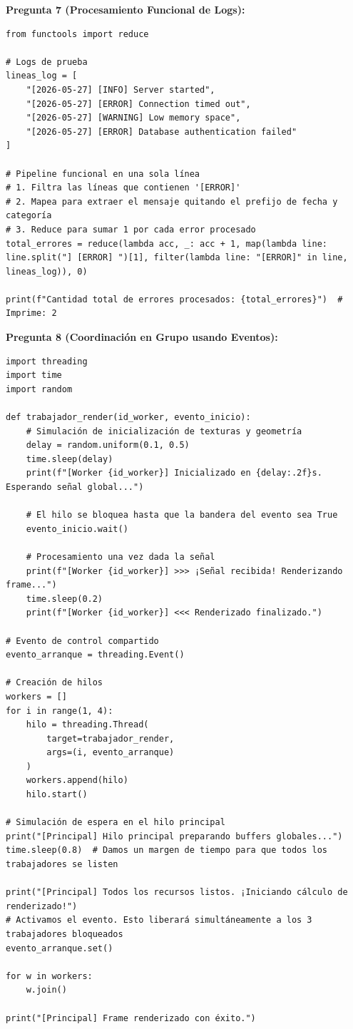 \documentclass[12pt,letterpaper]{article}
\begin{document}
\textbf{Pregunta 7 (Procesamiento Funcional de Logs):}
\begin{verbatim}
from functools import reduce

# Logs de prueba
lineas_log = [
    "[2026-05-27] [INFO] Server started",
    "[2026-05-27] [ERROR] Connection timed out",
    "[2026-05-27] [WARNING] Low memory space",
    "[2026-05-27] [ERROR] Database authentication failed"
]

# Pipeline funcional en una sola línea
# 1. Filtra las líneas que contienen '[ERROR]'
# 2. Mapea para extraer el mensaje quitando el prefijo de fecha y categoría
# 3. Reduce para sumar 1 por cada error procesado
total_errores = reduce(lambda acc, _: acc + 1, map(lambda line: line.split("] [ERROR] ")[1], filter(lambda line: "[ERROR]" in line, lineas_log)), 0)

print(f"Cantidad total de errores procesados: {total_errores}")  # Imprime: 2
\end{verbatim}

\bigskip

\textbf{Pregunta 8 (Coordinación en Grupo usando Eventos):}
\begin{verbatim}
import threading
import time
import random

def trabajador_render(id_worker, evento_inicio):
    # Simulación de inicialización de texturas y geometría
    delay = random.uniform(0.1, 0.5)
    time.sleep(delay)
    print(f"[Worker {id_worker}] Inicializado en {delay:.2f}s. Esperando señal global...")
    
    # El hilo se bloquea hasta que la bandera del evento sea True
    evento_inicio.wait()
    
    # Procesamiento una vez dada la señal
    print(f"[Worker {id_worker}] >>> ¡Señal recibida! Renderizando frame...")
    time.sleep(0.2)
    print(f"[Worker {id_worker}] <<< Renderizado finalizado.")

# Evento de control compartido
evento_arranque = threading.Event()

# Creación de hilos
workers = []
for i in range(1, 4):
    hilo = threading.Thread(
        target=trabajador_render, 
        args=(i, evento_arranque)
    )
    workers.append(hilo)
    hilo.start()

# Simulación de espera en el hilo principal
print("[Principal] Hilo principal preparando buffers globales...")
time.sleep(0.8)  # Damos un margen de tiempo para que todos los trabajadores se listen

print("[Principal] Todos los recursos listos. ¡Iniciando cálculo de renderizado!")
# Activamos el evento. Esto liberará simultáneamente a los 3 trabajadores bloqueados
evento_arranque.set()

for w in workers:
    w.join()

print("[Principal] Frame renderizado con éxito.")
\end{verbatim}
\end{document}
